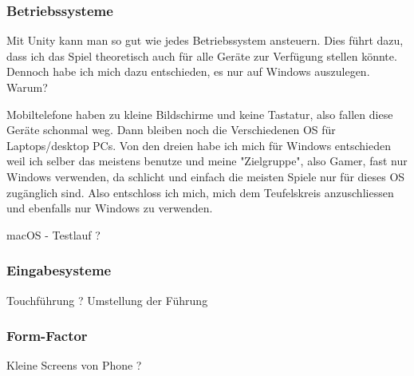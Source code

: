 \subsubsection{Betriebssysteme}
Mit Unity kann man so gut wie jedes Betriebssystem ansteuern.
Dies führt dazu, dass ich das Spiel theoretisch auch für alle Geräte zur Verfügung stellen könnte. 
Dennoch habe ich mich dazu entschieden, es nur auf Windows auszulegen.
Warum?

Mobiltelefone haben zu kleine Bildschirme und keine Tastatur, also fallen diese Geräte schonmal weg.
Dann bleiben noch die Verschiedenen OS für Laptops/desktop PCs.
Von den dreien habe ich mich für Windows entschieden weil ich selber das meistens benutze und meine "Zielgruppe", also Gamer, fast nur Windows verwenden, da schlicht und einfach die meisten Spiele nur für dieses OS zugänglich sind.
Also entschloss ich mich, mich dem Teufelskreis anzuschliessen und ebenfalls nur Windows zu verwenden.

macOS - Testlauf ? 

\subsubsection{Eingabesysteme}

Touchführung ? Umstellung der Führung

\subsubsection{Form-Factor}

Kleine Screens von Phone ?